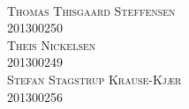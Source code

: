 \begin{titlingpage}
\begin{adjustwidth}{1.0cm}{1.0cm}
{		\vspace*{1\onelineskip}
		\par
		\vspace*{1\onelineskip}
		\par\vspace*{6\onelineskip}
		\Large{}\\
		\vspace*{1\onelineskip}
		\LARGE\textsc{Thomas Thisgaard Steffensen}\\
		\small 201300250\\
		\vspace*{0.1\onelineskip}
		\LARGE\textsc{Theis Nickelsen}\\
		\small 201300249\\
		\vspace*{0.1\onelineskip}
		\LARGE\textsc{Stefan Stagstrup Krause-Kjær}\\
		\small 201300256\\
		

		\vspace*{1\onelineskip}
	}
\end{adjustwidth}
	\vfill
	\large{}\\
	\large{}\hfill
	

\end{titlingpage}
